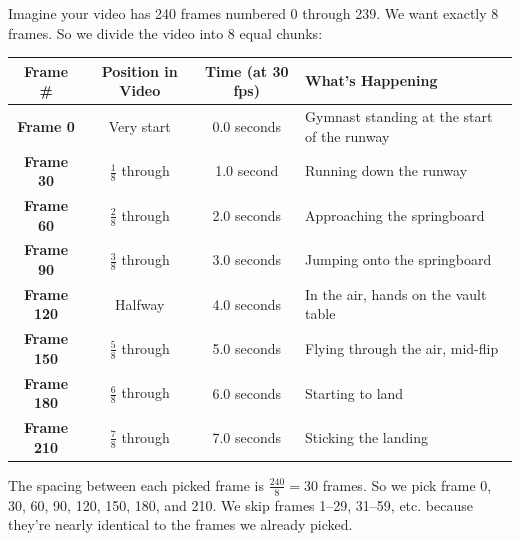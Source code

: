 \documentclass[12pt, a4paper]{article}
\begin{document}
\begin{examplebox}
Imagine your video has 240 frames numbered 0 through 239. We want exactly 8 frames. So we divide the video into 8 equal chunks:
\begin{center}
\renewcommand{\arraystretch}{1.3}
\begin{tabular}{cccl}
\toprule
\textbf{Frame \#} & \textbf{Position in Video} & \textbf{Time (at 30 fps)} & \textbf{What's Happening} \\
\midrule
\textbf{Frame 0} & Very start & 0.0 seconds & Gymnast standing at the start of the runway \\
\textbf{Frame 30} & $\frac{1}{8}$ through & 1.0 second & Running down the runway \\
\textbf{Frame 60} & $\frac{2}{8}$ through & 2.0 seconds & Approaching the springboard \\
\textbf{Frame 90} & $\frac{3}{8}$ through & 3.0 seconds & Jumping onto the springboard \\
\textbf{Frame 120} & Halfway & 4.0 seconds & In the air, hands on the vault table \\
\textbf{Frame 150} & $\frac{5}{8}$ through & 5.0 seconds & Flying through the air, mid-flip \\
\textbf{Frame 180} & $\frac{6}{8}$ through & 6.0 seconds & Starting to land \\
\textbf{Frame 210} & $\frac{7}{8}$ through & 7.0 seconds & Sticking the landing \\
\bottomrule
\end{tabular}
\end{center}
The spacing between each picked frame is $\frac{240}{8} = 30$ frames. So we pick frame 0, 30, 60, 90, 120, 150, 180, and 210. We skip frames 1--29, 31--59, etc. because they're nearly identical to the frames we already picked.
\end{examplebox}
\end{document}
